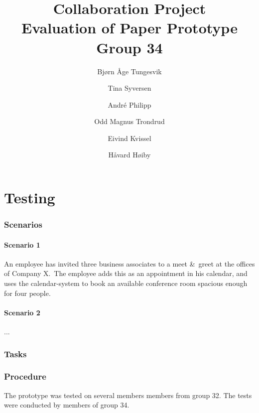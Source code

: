 \documentclass{article}
\begin{document}
\begin{titlepage}
\title{Collaboration Project\\
\textbf{Evaluation of Paper Prototype}\\
Group 34}
\author{Bj\o rn \AA ge Tungesvik\and Tina Syversen\and Andr\'e Philipp\and Odd Magnus Trondrud\and Eivind Kvissel\and H\aa vard H\o iby}
\maketitle
\end{titlepage}

\bigskip

\part{Testing}

\section{Scenarios}

\subsection{Scenario 1}

An employee has invited three business associates to a meet \&\ greet at the
offices of Company X.\ The employee adds this as an appointment in his
calendar, and uses the calendar-system to book an available conference room
spacious enough for four people.

\subsection{Scenario 2}

...

\section{Tasks}

\section{Procedure}

The prototype was tested on several members members from group 32. The tests
were conducted by members of group 34.
\end{document}
